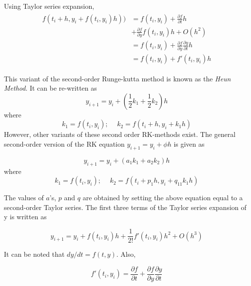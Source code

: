 \documentclass[book.tex]{subfiles}
\begin{document}
\begin{marginfigure}
	Using Taylor series expansion,
\begin{eqnarray*}
	\begin{split}
f(t_i+h,y_i + f(t_i,y_i)h))& = f(t_i,y_i) + \frac{\partial f}{\partial t}h \\
& + \frac{\partial f}{\partial y}f(t_i,y_i)h+ O(h^2) \\
& = f(t_i,y_i) + \frac{\partial f}{\partial y}\frac{\partial y}{\partial t}h \\
& = f(t_i,y_i) + f'(t_i,y_i)h 
\end{split}
\end{eqnarray*}	
\end{marginfigure}
This variant of the second-order Runge-kutta method is known as the \textit{Heun Method}. It can be re-written as
\begin{equation*}
y_{i+1} = y_{i} + (\frac{1}{2}k_1 + \frac{1}{2}k_2)h
\end{equation*}
where
\begin{equation*}
k_1 = f(t_i,y_i);\hspace{15pt}	k_2 = f(t_i + h,y_i + k_1h)		
\end{equation*}
However, other variants of these second order RK-methods exist. The general second-order version of the RK equation $y_{i+1} = y_{i} + \phi h$  is given as

\begin{equation*}
y_{i+1} = y_{i} + (a_1k_1 + a_2k_2)h
\end{equation*}
where
\begin{equation*}
		k_1 = f(t_i,y_i) ; \hspace{15pt} k_2 = f(t_i + p_1h,y_i + q_{11}k_1h)		
\end{equation*}

The values of $a$'s, $p$ and $q$ are obtained by setting the above equation equal to a second-order Taylor series. The first three terms of the Taylor series expansion of y is written as  

\begin{equation*}
y_{i+1} = y_i + f(t_i,y_i)h + \frac{1}{2!}f'(t_i,y_i)h^2 + O(h^3)	
\end{equation*}

It can be noted that $dy/dt = f(t,y)$. Also,

\begin{equation*}
f'(t_i,y_i) =\frac{\partial f}{\partial t} + \frac{\partial f}{\partial y}\frac{\partial y}{\partial t}
\end{equation*}
\end{document}
